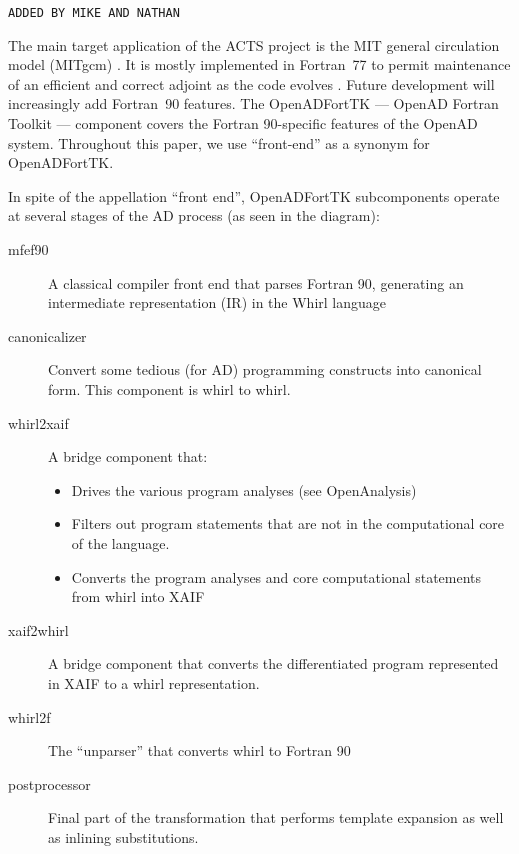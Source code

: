 \documentclass[acmtocl,acmnow]{acmtrans2m}
\begin{document}
{\tt ADDED BY MIKE AND NATHAN }

The main target application of the ACTS project is the MIT general
circulation model (MITgcm) \cite{mars-eta:97b,mars-eta:97a}.
It is mostly implemented in Fortran~77 to permit maintenance of an
efficient and correct adjoint as the code evolves \cite{HHG02}. Future
development will increasingly add Fortran~90 features.  The
OpenADFortTK --- OpenAD Fortran Toolkit --- component covers the
Fortran 90-specific features of the OpenAD system. Throughout this
paper, we use ``front-end'' as a synonym for OpenADFortTK.

In spite of the appellation ``front end'', OpenADFortTK subcomponents
operate at several stages of the AD process (as seen in the diagram):

   \begin{description}
     \item[mfef90] A classical compiler front end that parses
       Fortran 90, generating an intermediate representation (IR)
       in the Whirl language

     \item[canonicalizer] Convert some tedious (for AD) 
        programming constructs into canonical form. This component
        is whirl to whirl.

     \item[whirl2xaif] A bridge component that:
        \begin{itemize}
           \item Drives the various program analyses (see OpenAnalysis)
        
           \item Filters out program statements that are not in the
                 computational core of the language.

           \item Converts the program analyses and core computational
                 statements from whirl into XAIF
	\end{itemize}

     \item[xaif2whirl] A bridge component that converts the 
        differentiated program represented in XAIF
        to a whirl representation.

     \item[whirl2f] The ``unparser'' that converts whirl to
        Fortran 90

     \item[postprocessor] Final part of the transformation that
        performs template expansion as well as inlining substitutions.

   \end{description}
\end{document}
